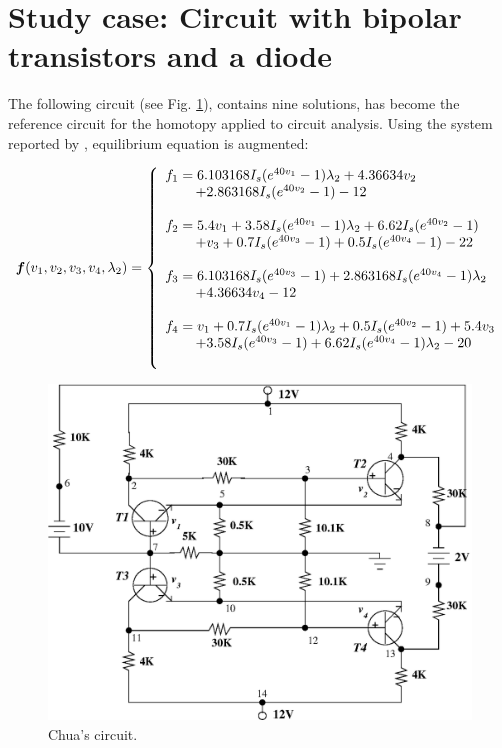 \documentclass[conference,letterpaper,onecolumn]{IEEEtran}
\newcommand{\pig}[1]{\mbox{\boldmath ${#1}$}	}
\begin{document}
\section{Study case: Circuit with bipolar transistors and a diode}

The following circuit \cite{homo_chua} (see Fig. \ref{newchua}), contains nine solutions, has become the reference circuit for the homotopy applied to circuit analysis. Using the system reported by \cite{homo_chua}, equilibrium equation is augmented:

{ 
\begin{equation}
\pig{f}(v_1,v_2,v_3,v_4,\lambda_2)= \left\{
\begin{array}{ll}
f_1= 6.103168I_s(e^{40v_1}-1)\lambda_2+4.36634v_2\\ \,\qquad+2.863168I_s(e^{40v_2}-1)-12\\\\
f_2=5.4v_1+3.58I_s(e^{40v_1}-1)\lambda_2+6.62I_s(e^{40v_2}-1)\\ \,\qquad+v_3+0.7I_s(e^{40v_3}-1)+0.5I_s(e^{40v_4}-1)-22\\\\
f_3=6.103168I_s(e^{40v_3}-1)+2.863168I_s(e^{40v_4}-1)\lambda_2\\ \,\qquad+4.36634v_4-12\\\\
f_4=v_1+0.7I_s(e^{40v_1}-1)\lambda_2+0.5I_s(e^{40v_2}-1)+5.4v_3\\ \,\qquad+3.58I_s(e^{40v_3}-1)+6.62I_s(e^{40v_4}-1)\lambda_2-20 \\\\
\end{array}\right.
\label{fxl}
\end{equation}
}
 
\begin{figure}[hbtp]
\centering
\includegraphics[scale=0.7]{fig/newchua.eps}
\caption{Chua's circuit.}
\label{newchua}
\end{figure}
\end{document}
